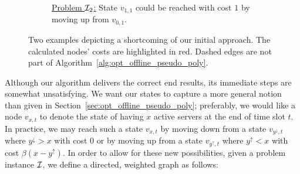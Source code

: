 \begin{exmpl}
\begin{figure}[H]
\begin{subfigure}[b]{0.49\textwidth}
{}
\caption{\underline{Problem $\mathcal{I}_2$:} State $v_{1,1}$ could be reached with cost $1$ by moving up from $v_{0,1}$.}
\end{subfigure}
\caption{Two examples depicting a shortcoming of our initial approach. The calculated nodes' costs are highlighted in red. Dashed edges are not part of Algorithm~\ref{alg:opt_offline_pseudo_poly}.}
\end{figure}
\end{exmpl}
Although our algorithm delivers the correct end results, its immediate steps are somewhat unsatisfying. We want our states to capture a more general notion than given in Section~\ref{sec:opt_offline_pseudo_poly}; preferably, we would like a node $v_{x,t}$ to denote the state of having $x$ active servers at the end of time slot $t$. In practice, we may reach such a state $v_{x,t}$ by moving down from a state $v_{y^\downarrow,t}$ where $y^\downarrow>x$ with cost $0$ or by moving up from a state $v_{y^\uparrow,t}$ where $y^\uparrow<x$ with cost $\beta(x-y^\uparrow)$. In order to allow for these new possibilities, given a problem instance $\mathcal{I}$, we define a directed, weighted graph as follows:
